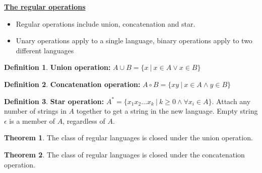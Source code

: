 \documentclass[11pt]{article}
\theoremstyle{definition}
\newtheorem{defn}{Definition}[section]
\newtheorem{thm}{Theorem}[section]
\begin{document}
\textbf{\underline{The regular operations}}
\begin{itemize}[leftmargin=*]
    \item Regular operations include union, concatenation and star.
    \item Unary operations apply to a single language, binary operations apply to two different languages
\end{itemize}
\begin{defn}
\textbf{Union operation:} $A\cup B = \{x\ |\ x\in A \lor x\in B\}$
\end{defn}
\begin{defn}
\textbf{Concatenation operation:} $A\circ B = \{xy\ |\ x\in A \land y\in B\}$
\end{defn}
\begin{defn}
\textbf{Star operation:} $A^{*} = \{x_1x_2\ldots x_k\ |\ k\geq 0 \land \forall x_i \in A\}$. Attach any number of strings in $A$ together to get a string in the new language. Empty string $\epsilon$ is a member of $A$, regardless of $A$.
\end{defn}

\begin{thm}
The class of regular languages is closed under the union operation.
\end{thm}
\begin{thm}
The class of regular languages is closed under the concatenation operation.
\end{thm}
\end{document}
